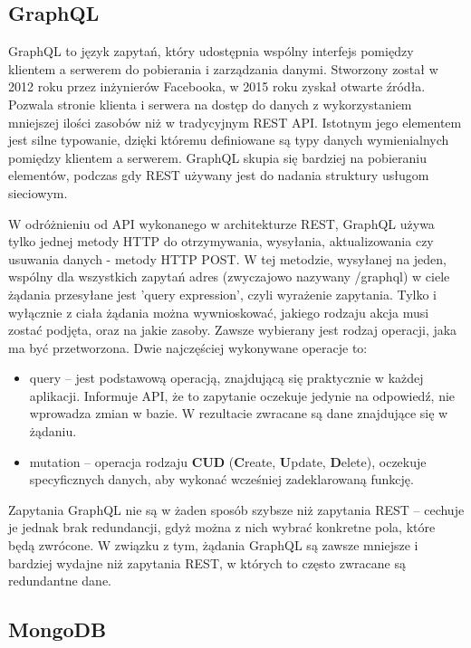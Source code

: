 \documentclass[12pt,twoside]{article}
\begin{document}
\subsection{GraphQL}

GraphQL to język zapytań, który udostępnia wspólny interfejs pomiędzy klientem a serwerem do pobierania i zarządzania danymi. Stworzony został w 2012 roku przez inżynierów Facebooka, w 2015 roku zyskał otwarte źródła. Pozwala stronie klienta i serwera na dostęp do danych z wykorzystaniem mniejszej ilości zasobów niż w tradycyjnym REST API. Istotnym jego elementem jest silne typowanie, dzięki któremu definiowane są typy danych wymienialnych pomiędzy klientem a serwerem. GraphQL skupia się bardziej na pobieraniu elementów, podczas gdy REST używany jest do nadania struktury usługom sieciowym. 

W odróżnieniu od API wykonanego w architekturze REST, GraphQL używa tylko jednej metody HTTP do otrzymywania, wysyłania, aktualizowania czy usuwania danych - metody HTTP POST. W tej metodzie, wysyłanej na jeden, wspólny dla wszystkich zapytań adres (zwyczajowo nazywany /graphql) w ciele żądania przesyłane jest 'query expression', czyli wyrażenie zapytania. Tylko i wyłącznie z ciała żądania można wywnioskować, jakiego rodzaju akcja musi zostać podjęta, oraz na jakie zasoby. Zawsze wybierany jest rodzaj operacji, jaka ma być przetworzona. Dwie najczęściej wykonywane operacje to:
\begin{itemize}
	\item query – jest podstawową operacją, znajdującą się praktycznie w każdej aplikacji. Informuje API, że to zapytanie oczekuje jedynie na odpowiedź, nie wprowadza zmian w bazie. W rezultacie zwracane są dane znajdujące się w żądaniu.
	\item mutation – operacja rodzaju \textbf{CUD} (\textbf{C}reate, \textbf{U}pdate, \textbf{D}elete), oczekuje specyficznych danych,
aby wykonać wcześniej zadeklarowaną funkcję.
\end{itemize} 
Zapytania GraphQL nie są w żaden sposób szybsze niż zapytania REST -- cechuje je jednak brak redundancji, gdyż można z nich wybrać konkretne pola, które będą zwrócone. W związku z tym, żądania GraphQL są zawsze mniejsze i bardziej wydajne niż zapytania REST, w których to często zwracane są redundantne dane.

\subsection{MongoDB}
\end{document}
